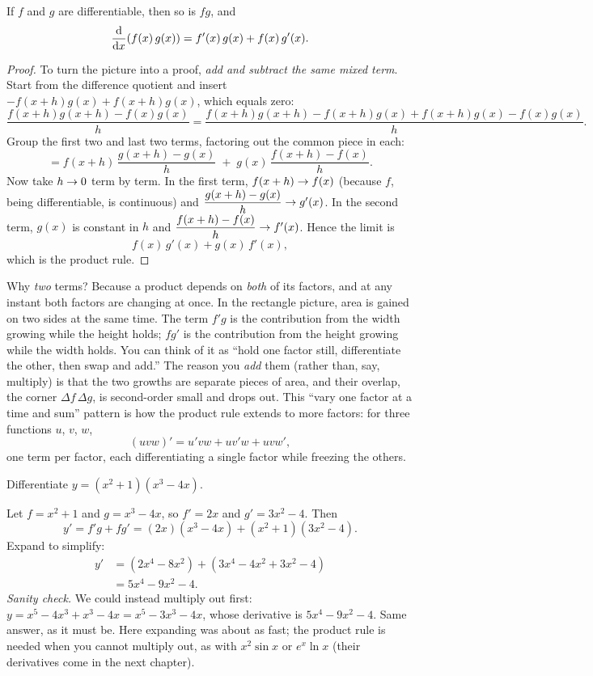 \begin{theorem}\label{ch11:thm-product}
If $f$ and $g$ are differentiable, then so is $fg$, and
\[
  \frac{\mathrm{d}}{\mathrm{d} x}\!\left(f(x)\,g(x)\right) = f'(x)\,g(x) + f(x)\,g'(x).
\]
\end{theorem}

\begin{proof}
To turn the picture into a proof, \emph{add and subtract the same mixed term}. Start
from the difference quotient and insert $-f(x+h)g(x)+f(x+h)g(x)$, which equals zero:
\[
  \frac{f(x+h)g(x+h) - f(x)g(x)}{h}
  = \frac{f(x+h)g(x+h) - f(x+h)g(x) + f(x+h)g(x) - f(x)g(x)}{h}.
\]
Group the first two and last two terms, factoring out the common piece in each:
\[
  = f(x+h)\,\frac{g(x+h)-g(x)}{h} \;+\; g(x)\,\frac{f(x+h)-f(x)}{h}.
\]
Now take $h\to 0$ term by term. In the first term, $f(x+h)\to f(x)$ (because $f$, being
differentiable, is continuous) and $\dfrac{g(x+h)-g(x)}{h}\to g'(x)$. In the second term,
$g(x)$ is constant in $h$ and $\dfrac{f(x+h)-f(x)}{h}\to f'(x)$. Hence the limit is
\[
  f(x)\,g'(x) + g(x)\,f'(x),
\]
which is the product rule.
\end{proof}

\begin{whybox}
Why \emph{two} terms? Because a product depends on \emph{both} of its factors, and at any
instant both factors are changing at once. In the rectangle picture, area
is gained on two sides at the same time. The term $f'g$ is the contribution from the width
growing while the height holds; $fg'$ is the contribution from the height growing while
the width holds. You can think of it as ``hold one factor still, differentiate the other,
then swap and add.'' The reason you \emph{add} them (rather than, say, multiply) is that
the two growths are separate pieces of area, and their overlap, the corner
$\Delta f\,\Delta g$, is second-order small and drops out. This ``vary one factor at a
time and sum'' pattern is how the product rule extends to more factors: for three
functions $u$, $v$, $w$,
\[
  (uvw)' = u'vw + uv'w + uvw',
\]
one term per factor, each differentiating a single factor while freezing the others.
\end{whybox}

\begin{example}\label{ch11:ex-prod1}
Differentiate $y = (x^2+1)(x^3 - 4x)$.

Let $f = x^2+1$ and $g = x^3 - 4x$, so $f' = 2x$ and $g' = 3x^2 - 4$. Then
\[
  y' = f'g + fg' = (2x)(x^3-4x) + (x^2+1)(3x^2-4).
\]
Expand to simplify:
\begin{align*}
  y' &= (2x^4 - 8x^2) + (3x^4 - 4x^2 + 3x^2 - 4) \\
     &= 5x^4 - 9x^2 - 4 .
\end{align*}
\emph{Sanity check.} We could instead multiply out first:
$y = x^5 - 4x^3 + x^3 - 4x = x^5 - 3x^3 - 4x$, whose derivative is
$5x^4 - 9x^2 - 4$. Same answer, as it must be. Here expanding was about as fast; the
product rule is needed when you cannot multiply out, as with $x^2\sin x$ or $e^x\ln x$
(their derivatives come in the next chapter).
\end{example}

